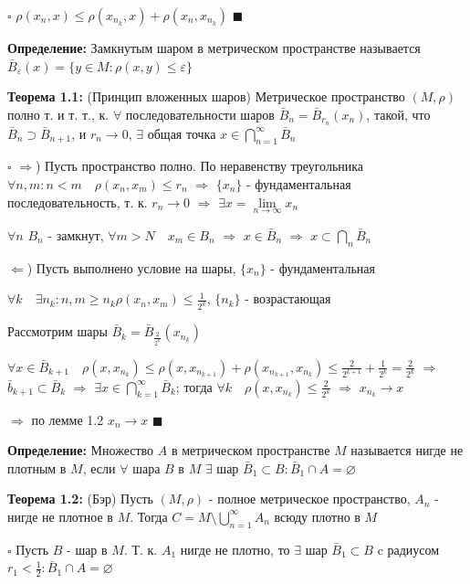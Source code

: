 \documentclass[a4paper]{report}
\begin{document}
\noindent $\square$ $\rho(x_n,x)\le\rho(x_{n_k},x)+\rho(x_n,x_{n_k})$ $\blacksquare$
\bigskip

\noindent\textbf{Определение:} Замкнутым шаром в метрическом пространстве называется $\bar B_\varepsilon(x)=\{y\in M\colon
\rho(x,y)\le\varepsilon\}$
\bigskip

\noindent\textbf{Теорема 1.1:} (Принцип вложенных шаров) Метрическое пространство $(M,\rho)$ полно т. и т. т., к. $\forall$
последовательности шаров $\bar B_n=\bar B_{r_n}(x_n)$, такой, что $\bar B_n\supset\bar B_{n+1}$, и $r_n\to0$, $\exists$
общая точка $x\in\bigcap\limits_{n=1}^\infty\bar B_n$

\noindent $\square$ $\Rightarrow$) Пусть пространство полно. По неравенству треугольника $\forall n,m\colon n<m\quad
\rho(x_n,x_m)\le r_n$ $\Rightarrow$ $\{x_n\}$ - фундаментальная последовательность, т. к. $r_n\to0$ $\Rightarrow$
$\exists x=\lim\limits_{n\to\infty} x_n$

$\forall n$ $B_n$ - замкнут, $\forall m>N\quad x_m\in B_n$ $\Rightarrow$ $x\in\bar B_n$ $\Rightarrow$ $x\subset\bigcap\limits_n
\bar B_n$

$\Leftarrow$) Пусть выполнено условие на шары, $\{x_n\}$ - фундаментальная

$\forall k\quad\exists n_k\colon n,m\ge n_k\rho(x_n,x_m)\le\displaystyle\frac{1}{2^k}$, $\{n_k\}$ - возрастающая

Рассмотрим шары $\bar B_k=\bar B_{\displaystyle\frac{2}{2^k}}(x_{n_k})$

$\forall x\in\bar B_{k+1}\quad \rho(x,x_{n_k})\le\rho(x,x_{n_{k+1}})+\rho(x_{n_{k+1}},x_{n_k})\le\displaystyle\frac{2}{2^{k+1}}+\displaystyle\frac{1}{2^k}=
\displaystyle\frac{2}{2^k}$ $\Rightarrow$ $\bar b_{k+1}\subset\bar B_k$ $\Rightarrow$ $\exists x\in\bigcap\limits_{k=1}^\infty\bar B_k$;
тогда $\forall k\quad\rho(x,x_{n_k})\le\displaystyle\frac{2}{2^k}$ $\Rightarrow$ $x_{n_k}\to x$

$\Rightarrow$ по лемме 1.2 $x_n\to x$ $\blacksquare$
\bigskip

\noindent\textbf{Определение:} Множество $A$ в метрическом пространстве $M$ называется нигде не плотным в $M$, если $\forall$
шара $B$ в $M$ $\exists$ шар $\bar B_1\subset B\colon\bar B_1\cap A=\varnothing$
\bigskip

\noindent\textbf{Теорема 1.2:} (Бэр) Пусть $(M,\rho)$ - полное метрическое пространство, $A_n$ - нигде не плотное в $M$.
Тогда $C=M\setminus\bigcup\limits_{n=1}^\infty A_n$ всюду плотно в $M$

\noindent $\square$ Пусть $B$ - шар в $M$. Т. к. $A_1$ нигде не плотно, то $\exists$ шар $\bar B_1\subset B$ c радиусом
$r_1<\frac12\colon\bar B_1\cap A=\varnothing$
\end{document}
